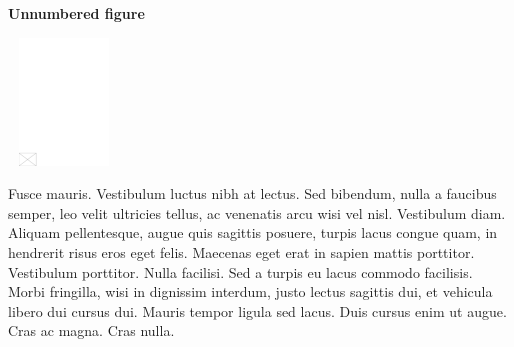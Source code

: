 \documentclass[APA,Times1COL]{WileyNJDv5} %
\begin{document}

\noindent\textbf{Unnumbered figure}


\begin{center}
\includegraphics[width=7pc,height=8pc,draft]{empty}
\end{center}


Fusce mauris. Vestibulum luctus nibh at lectus. Sed bibendum, nulla a faucibus semper, leo velit ultricies tellus, ac
venenatis arcu wisi vel nisl. Vestibulum diam. Aliquam pellentesque, augue quis sagittis posuere, turpis lacus congue
quam, in hendrerit risus eros eget felis. Maecenas eget erat in sapien mattis porttitor. Vestibulum porttitor. Nulla
facilisi. Sed a turpis eu lacus commodo facilisis. Morbi fringilla, wisi in dignissim interdum, justo lectus sagittis dui, et
vehicula libero dui cursus dui. Mauris tempor ligula sed lacus. Duis cursus enim ut augue. Cras ac magna. Cras nulla.
\end{document}
